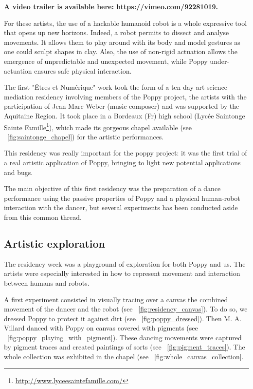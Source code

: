\textbf{A video trailer is available here: \url{https://vimeo.com/92281019}.}

For these artists, the use of a hackable humanoid robot is a whole expressive tool that opens up new horizons. Indeed, a robot permits to dissect and analyse movements. It allows them to play around with its body and model gestures as one could sculpt shapes in clay. Also, the use of non-rigid actuation allows the emergence of unpredictable and unexpected movement, while Poppy under-actuation ensures safe physical interaction.


The first "Êtres et Numérique" work took the form of a ten-day art-science-mediation residency involving members of the Poppy project, the artists with the participation of Jean Marc Weber (music composer) and was supported by the Aquitaine Region. It took place in a Bordeaux (Fr) high school (Lycée Saintonge Sainte Famille\footnote{\url{http://www.lyceesaintefamille.com/}}), which made its gorgeous chapel available (see \figurename~\ref{fig:saintonge_chapel}) for the artistic performances.


This residency was really important for the poppy project: it was the first trial of a real artistic application of Poppy, bringing to light new potential applications and bugs.

The main objective of this first residency was the preparation of a dance performance using the passive properties of Poppy and a physical human-robot interaction with the dancer, but several experiments has been conducted aside from this common thread.


\subsection{Artistic exploration} %

The residency week was a playground of exploration for both Poppy and us. The artists were especially interested in how to represent movement and interaction between humans and robots.

A first experiment consisted in visually tracing over a canvas the combined movement of the dancer and the robot (see \figurename~\ref{fig:residency_canvas}). To do so, we dressed Poppy to protect it against dirt (see \figurename~\ref{fig:poppy_dressed}). Then M. A. Villard danced with Poppy on canvas covered with pigments (see \figurename~\ref{fig:poppy_playing_with_pigment}). These dancing movements were captured by pigment traces and created paintings of sorts (see \figurename~\ref{fig:pigment_traces}). The whole collection was exhibited in the chapel (see \figurename~\ref{fig:whole_canvas_collection}.

